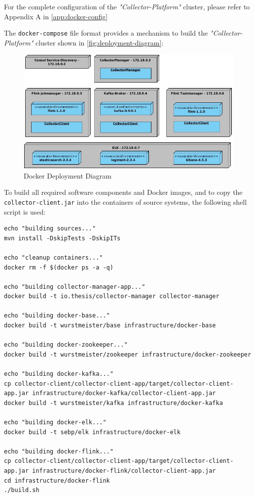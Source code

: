 For the complete configuration of the \textit{"Collector-Platform"} cluster, please refer to Appendix A in \autoref{app:docker-config}

The \verb|docker-compose| file format provides a mechanism to build the \textit{"Collector-Platform"} cluster shown in
\autoref{fig:deployment-diagram}:

\begin{figure}[H]
	\centering
	\includegraphics[width=1.0\textwidth]{../uml/deployment-diagram.jpg}
	\caption{Docker Deployment Diagram}
	\label{fig:deployment-diagram}
\end{figure}

To build all required software components and Docker images, and to copy the \verb|collector-client.jar| into the containers of source systems,
the following shell script is used:

\begin{lstlisting}[caption={build-docker-images-sh}, captionpos=b, label={lst:docker-build-images}]
echo "building sources..."
mvn install -DskipTests -DskipITs

echo "cleanup containers..."
docker rm -f $(docker ps -a -q)

echo "building collector-manager-app..."
docker build -t io.thesis/collector-manager collector-manager

echo "building docker-base..."
docker build -t wurstmeister/base infrastructure/docker-base

echo "building docker-zookeeper..."
docker build -t wurstmeister/zookeeper infrastructure/docker-zookeeper

echo "building docker-kafka..."
cp collector-client/collector-client-app/target/collector-client-app.jar infrastructure/docker-kafka/collector-client-app.jar
docker build -t wurstmeister/kafka infrastructure/docker-kafka

echo "building docker-elk..."
docker build -t sebp/elk infrastructure/docker-elk

echo "building docker-flink..."
cp collector-client/collector-client-app/target/collector-client-app.jar infrastructure/docker-flink/collector-client-app.jar
cd infrastructure/docker-flink
./build.sh
\end{lstlisting}

